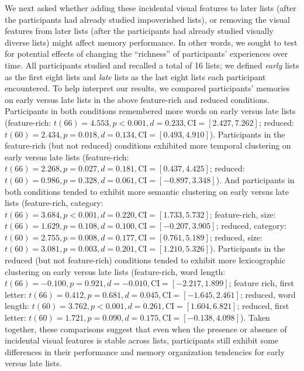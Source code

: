 \documentclass[11pt]{article}
\begin{document}
We next asked whether adding these incidental visual features to later lists
(after the participants had already studied impoverished lists), or removing
the visual features from later lists (after the participants had already
studied visually diverse lists) might affect memory performance. In other
words, we sought to test for potential effects of changing the ``richness'' of
participants' experiences over time. All participants studied and recalled a
total of 16 lists; we defined \textit{early} lists as the first eight lists and
\textit{late} lists as the last eight lists each participant encountered. To
help interpret our results, we compared participants' memories on early versus
late lists in the above feature-rich and reduced conditions. Participants in
both conditions remembered more words on early versus late lists (feature-rich:
$t(66) = 4.553, p < 0.001, d = 0.233, \mathrm{CI} = [2.427, 7.262]$; reduced:
$t(60) = 2.434, p = 0.018, d = 0.134, \mathrm{CI} = [0.493, 4.910]$).
Participants in the feature-rich (but not reduced) conditions exhibited more
temporal clustering on early versus late lists (feature-rich: $t(66) = 2.268, p
= 0.027, d = 0.181, \mathrm{CI} = [0.437, 4.425]$; reduced: $t(60) = 0.986, p =
0.328, d = 0.061, \mathrm{CI} = [-0.897, 3.348]$). And participants in both
conditions tended to exhibit more semantic clustering on early versus late
lists (feature-rich, category: $t(66) = 3.684, p < 0.001, d = 0.220,
\mathrm{CI} = [1.733, 5.732]$; feature-rich, size: $t(66) = 1.629, p = 0.108, d
= 0.100, \mathrm{CI} = [-0.207, 3.905] $; reduced, category: $t(60) = 2.755, p
= 0.008, d = 0.177, \mathrm{CI} = [0.761, 5.189]$; reduced, size: $t(60) =
3.081, p = 0.003, d = 0.201, \mathrm{CI} = [1.210, 5.326]$). Participants in
the reduced (but not feature-rich) conditions tended to exhibit more
lexicographic clustering on early versus late lists (feature-rich, word length:
$t(66) = -0.100, p = 0.921, d = -0.010, \mathrm{CI} = [-2.217, 1.899]$; feature
rich, first letter: $t(66) = 0.412, p = 0.681, d = 0.045, \mathrm{CI} =
[-1.645, 2.461]$; reduced, word length: $t(60) = 3.762, p < 0.001, d = 0.261,
\mathrm{CI} = [1.604, 6.821]$; reduced, first letter: $t(60) = 1.721, p =
0.090, d = 0.175, \mathrm{CI} = [-0.138, 4.098]$). Taken together, these
comparisons suggest that even when the presence or absence of incidental visual
features is stable across lists, participants still exhibit some differences in
their performance and memory organization tendencies for early versus late
lists.
\end{document}
